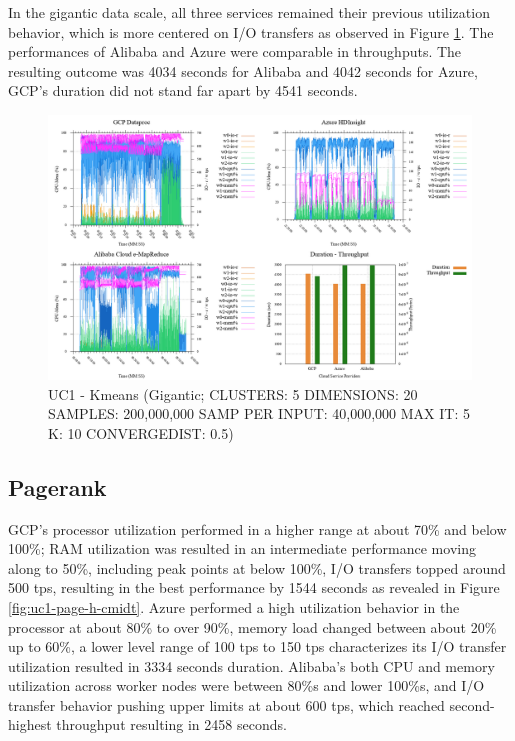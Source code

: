 \documentclass[review]{elsarticle}
\begin{document}
In the gigantic data scale, all three services remained their previous utilization behavior, which is more centered on I/O transfers as observed in Figure \ref{fig:uc1-kmeans-g-cmidt}. The performances of Alibaba and Azure were comparable in throughputs. The resulting outcome was 4034 seconds for Alibaba and 4042 seconds for Azure, GCP's duration did not stand far apart by 4541 seconds.

\begin{figure}[p]
	\caption{UC1 - Kmeans (Gigantic; CLUSTERS: 5 DIMENSIONS: 20 SAMPLES: 200,000,000 SAMP PER INPUT: 40,000,000 MAX IT: 5 K: 10 CONVERGEDIST: 0.5)}
	\label{fig:uc1-kmeans-g-cmidt}
	\includegraphics[width=\textwidth]{uc1-kmeans-g-cmidt}
	\centering
\end{figure}


\subsection{Pagerank}
GCP's processor utilization performed in a higher range at about 70\% and below 100\%; RAM utilization was resulted in an intermediate performance moving along to 50\%, including peak points at below 100\%, I/O transfers topped around 500 tps, resulting in the best performance by 1544 seconds as revealed in Figure \ref{fig:uc1-page-h-cmidt}. Azure performed a high utilization behavior in the processor at about 80\% to over 90\%, memory load changed between about 20\% up to 60\%, a lower level range of 100 tps to 150 tps characterizes its I/O transfer utilization resulted in 3334 seconds duration. Alibaba's both CPU and memory utilization across worker nodes were between 80\%s and lower 100\%s, and I/O transfer behavior pushing upper limits at about 600 tps, which reached second-highest throughput resulting in 2458 seconds.
 
\end{document}
